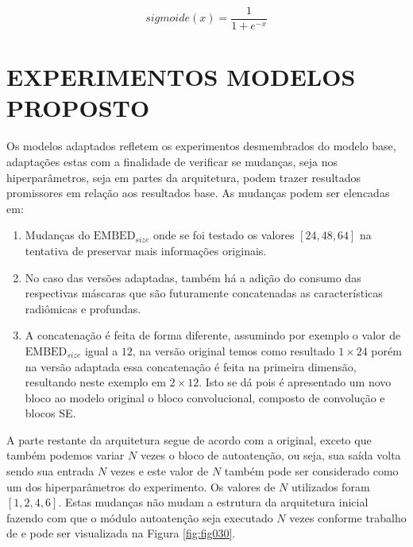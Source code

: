 \begin{equation}
\textit{sigmoide}(x) = \frac{1}{1 + e^{-x}}
\label{eq:sigmoide}
\end{equation}

\section{EXPERIMENTOS MODELOS PROPOSTO}
\label{sec:cap5_experimentos_adaptados}

Os modelos adaptados refletem os experimentos desmembrados do modelo base, adaptações estas com a finalidade de verificar se mudanças, seja nos hiperparâmetros, seja em partes da arquitetura, podem trazer resultados promissores em relação aos resultados base. As mudanças podem ser elencadas em: 

\begin{enumerate}

\item Mudanças do $\text{EMBED}_{size}$ onde se foi testado os valores $[24, 48, 64]$ na tentativa de preservar mais informações originais.

\item No caso das versões adaptadas, também há a adição do consumo das respectivas máscaras que são futuramente concatenadas as características radiômicas e profundas.

\item A concatenação é feita de forma diferente, assumindo por exemplo o valor de $\text{EMBED}_{size}$ igual a $12$, na versão original temos como resultado $1\times24$ porém na versão adaptada essa concatenação é feita na primeira dimensão, resultando neste exemplo em $2\times12$. Isto se dá pois é apresentado um novo bloco ao modelo original o bloco convolucional, composto de convolução e blocos \gls{SE}.

\end{enumerate}


A parte restante da arquitetura segue de acordo com a original, exceto que também podemos variar $N$ vezes o bloco de autoatenção, ou seja, sua saída volta sendo sua entrada $N$ vezes e este valor de $N$ também pode ser considerado como um dos hiperparâmetros do experimento. Os valores de $N$ utilizados foram $[1, 2, 4, 6]$. Estas mudanças não mudam a estrutura da arquitetura inicial fazendo com que o módulo autoatenção seja executado $N$ vezes conforme trabalho de \cite{vaswaniAttentionAllYou2023} e pode ser visualizada na Figura \ref{fig:fig030}.

